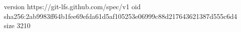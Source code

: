 version https://git-lfs.github.com/spec/v1
oid sha256:2ab9983ff64b1fee69efda61d5af105253e06999c88d217643621387d555c6d4
size 3210
